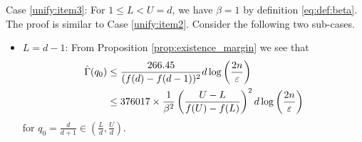 \documentclass[onecolumn,letterpaper]{IEEEtran}
\newcommand{\cp}{{q}}
\newcommand{\up}{{U}}
\newcommand{\lw}{{L}}
\newcommand{\bet}{{\beta}}
\newcommand{\exifinal}{{ 376017 \times \frac{1}{\bet^2} \left( \frac{\up-\lw}{f(\up)-f(\lw)} \right)^2  d\log \left( \frac{2n}{\varepsilon } \right)}}
\newcommand{\ftaup}{{\hat{\Gamma}}}
\newcommand{\cpns}{\cp_0}
\begin{document}
Case \ref{unify:item3}: For $1 \leq \lw < \up = d$, we have $\bet=1$ by definition \eqref{eq:def:beta}. 
The proof is similar to Case \ref{unify:item2}. Consider the following two sub-cases.
\begin{itemize}
\item \underline{$\lw=d-1$}:  From Proposition \ref{prop:existence_margin} we see that
    \begin{align}
    \ftaup(\cpns) &\le \frac{266.45}{(f(d)-f(d-1))^2} d \log \left( \frac{2n}{\varepsilon} \right) \notag\\
    &\le \exifinal
    \end{align}
    for $\cpns=\frac{d}{d+1}\in \left(\frac{\lw}{d},\frac{\up}{d}\right)$.
    

\end{itemize}
\end{document}
